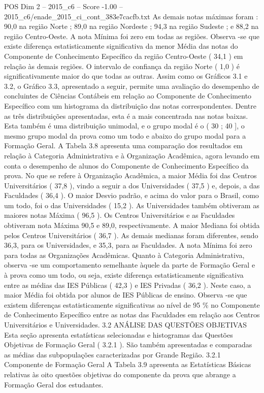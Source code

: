 \begin{textsample}{POS Dim 2 – 2015\_c6 – Score -1.00 – 2015\_c6/enade\_2015\_ci\_cont\_383e7cacfb.txt}
As demais notas máximas foram : 90,0 na região Norte ; 89,0 na região Nordeste ; 94,3 na região Sudeste ; e 88,2 na região Centro-Oeste.
A nota Mínima foi zero em todas as regiões.
Observa -se que existe diferença estatisticamente significativa da menor Média das notas do Componente de Conhecimento Específico da região Centro-Oeste ( 34,1 ) em relação às demais regiões.
O intervalo de confiança da região Norte ( 1,0 ) é significativamente maior do que todas as outras.
Assim como os Gráficos 3.1 e 3.2, o Gráfico 3.3, apresentado a seguir, permite uma avaliação do desempenho de concluintes de Ciências Contábeis em relação ao Componente de Conhecimento Específico com um histograma da distribuição das notas correspondentes.
Dentre as três distribuições apresentadas, esta é a mais concentrada nas notas baixas.
Esta também é uma distribuição unimodal, e o grupo modal é o ( 30 ; 40 ], o mesmo grupo modal da prova como um todo e abaixo do grupo modal para a Formação Geral.
A Tabela 3.8 apresenta uma comparação dos resultados em relação à Categoria Administrativa e à Organização Acadêmica, agora levando em conta o desempenho de alunos do Componente de Conhecimento Específico da prova.
No que se refere à Organização Acadêmica, a maior Média foi das Centros Universitários ( 37,8 ), vindo a seguir a dos Universidades ( 37,5 ) e, depois, a das Faculdades ( 36,4 ).
O maior Desvio padrão, e acima do valor para o Brasil, como um todo, foi o das Universidades ( 15,2 ).
As Universidades também obtiveram as maiores notas Máxima ( 96,5 ).
Os Centros Universitários e as Faculdades obtiveram nota Máxima 90,5 e 89,0, respectivamente.
A maior Mediana foi obtida pelos Centros Universitários ( 36,7 ).
As demais medianas foram diferentes, sendo 36,3, para os Universidades, e 35,3, para as Faculdades.
A nota Mínima foi zero para todas as Organizações Acadêmicas.
Quanto à Categoria Administrativa, observa -se um comportamento semelhante àquele da parte de Formação Geral e à prova como um todo, ou seja, existe diferença estatisticamente significativa entre as médias das IES Públicas ( 42,3 ) e IES Privadas ( 36,2 ).
Neste caso, a maior Média foi obtida por alunos de IES Públicas de ensino.
Observa -se que existem diferenças estatisticamente significativas ao nível de 95 \% no Componente de Conhecimento Específico entre as notas das Faculdades em relação aos Centros Universitários e Universidades. 3.2 ANÁLISE DAS QUESTÕES OBJETIVAS Esta seção apresenta estatísticas selecionadas e histogramas das Questões Objetivas de Formação Geral ( 3.2.1 ).
São também apresentadas e comparadas as médias das subpopulações caracterizadas por Grande Região. 3.2.1 Componente de Formação Geral A Tabela 3.9 apresenta as Estatísticas Básicas relativas às oito questões objetivas do componente da prova que abrange a Formação Geral dos estudantes.

\end{textsample}
